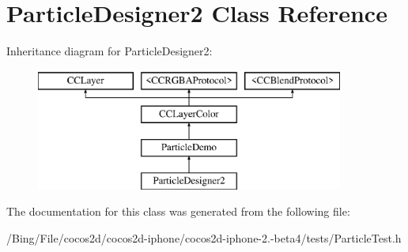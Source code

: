 \hypertarget{interface_particle_designer2}{\section{Particle\-Designer2 Class Reference}
\label{interface_particle_designer2}
}
Inheritance diagram for Particle\-Designer2\-:\begin{figure}[H]
\begin{center}
\leavevmode
\includegraphics[height=4.000000cm]{interface_particle_designer2}
\end{center}
\end{figure}


The documentation for this class was generated from the following file\-:\begin{DoxyCompactItemize}
\item 
/\-Bing/\-File/cocos2d/cocos2d-\/iphone/cocos2d-\/iphone-\/2.-\/beta4/tests/Particle\-Test.\-h\end{DoxyCompactItemize}
